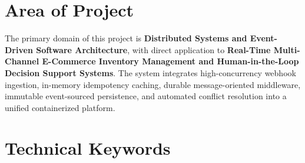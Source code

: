 \documentclass[oneside,a4paper,12pt]{report}
\begin{document}
\section{Area of Project}
The primary domain of this project is \textbf{Distributed Systems and Event-Driven Software Architecture}, with direct application to \textbf{Real-Time Multi-Channel E-Commerce Inventory Management and Human-in-the-Loop Decision Support Systems}. The system integrates high-concurrency webhook ingestion, in-memory idempotency caching, durable message-oriented middleware, immutable event-sourced persistence, and automated conflict resolution into a unified containerized platform.

\section{Technical Keywords}
\end{document}
